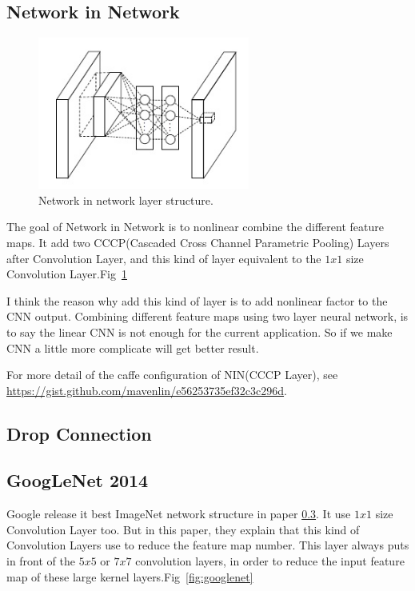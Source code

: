\documentclass[12pt]{article}
\begin{document}
    \subsection{Network in Network}
    \begin{figure}[!ht]
        \centering
        \includegraphics[height=5cm]{NIN.jpg}
        \caption{\label{fig:nin} Network in network layer structure. }
    \end{figure}
    The goal of Network in Network is to nonlinear combine the different feature maps. It add two CCCP(Cascaded Cross Channel Parametric Pooling) Layers after Convolution Layer, and this kind of layer equivalent to the $1x1$ size Convolution Layer.Fig~\ref{fig:nin}

    I think the reason why add this kind of layer is to add nonlinear factor to the CNN output. Combining different feature maps using two layer neural network, is to say the linear CNN is not enough for the current application. So if we make CNN a little more complicate will get better result.

    For more detail of the caffe configuration of NIN(CCCP Layer), see \url{https://gist.github.com/mavenlin/e56253735ef32c3c296d}.
    \subsection{Drop Connection}

    \subsection{GoogLeNet 2014}
    Google release it best ImageNet network structure in paper \ref{}. It use $1x1$ size Convolution Layer too. But in this paper, they explain that this kind of Convolution Layers use to reduce the feature map number. This layer always puts in front of the $5x5$ or $7x7$ convolution layers, in order to reduce the input feature map of these large kernel layers.Fig~\ref{fig:googlenet}
\end{document}
